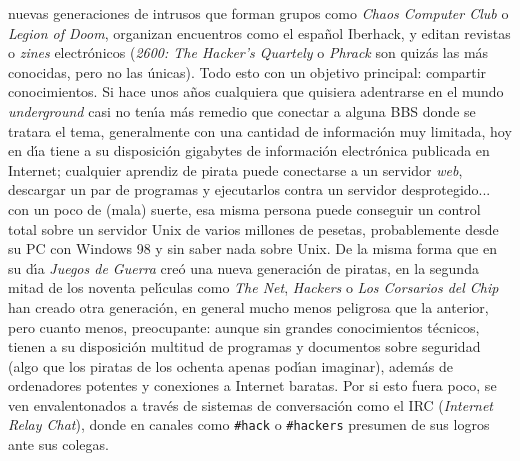 nuevas generaciones de intrusos que forman grupos como {\it Chaos Computer Club}
o {\it Legion of Doom}, organizan encuentros como el espa\~nol Iberhack, y 
editan revistas o {\it zines} electr\'onicos ({\it 2600: The Hacker's Quartely}
o {\it Phrack} son quiz\'as las m\'as conocidas, pero no las \'unicas). Todo 
esto con un objetivo principal: compartir conocimientos. Si hace unos a\~nos 
cualquiera que quisiera adentrarse en el mundo {\it underground} casi no 
ten\'{\i}a m\'as remedio que conectar a alguna BBS donde se tratara el tema, 
generalmente
con una cantidad de informaci\'on muy limitada, hoy en d\'{\i}a tiene a su 
disposici\'on gigabytes de informaci\'on electr\'onica publicada en Internet; 
cualquier aprendiz de pirata puede conectarse a un servidor {\it web}, descargar
un par de programas y ejecutarlos contra un servidor desprotegido... con un 
poco de (mala) suerte, esa misma persona puede conseguir un control total sobre
un servidor Unix de varios millones de pesetas, probablemente desde su PC con
Windows 98 y sin saber nada sobre Unix. De la misma forma que en su d\'{\i}a 
{\it Juegos de Guerra} cre\'o una nueva generaci\'on de piratas, en la segunda 
mitad de los noventa pel\'{\i}culas como {\it The Net}, {\it Hackers} o {\it Los
Corsarios del Chip} han creado otra generaci\'on, en general mucho menos 
peligrosa que la anterior, pero cuanto menos, preocupante: aunque sin grandes
conocimientos t\'ecnicos, tienen a su disposici\'on multitud de programas y 
documentos sobre seguridad (algo que los piratas de los ochenta apenas 
pod\'{\i}an imaginar), adem\'as de ordenadores potentes y conexiones a Internet
baratas. Por si esto fuera poco, se ven envalentonados a trav\'es de sistemas
de conversaci\'on como el IRC ({\it Internet Relay Chat}), donde en canales como
{\tt \#hack} o {\tt \#hackers} presumen de sus logros ante sus colegas. 
